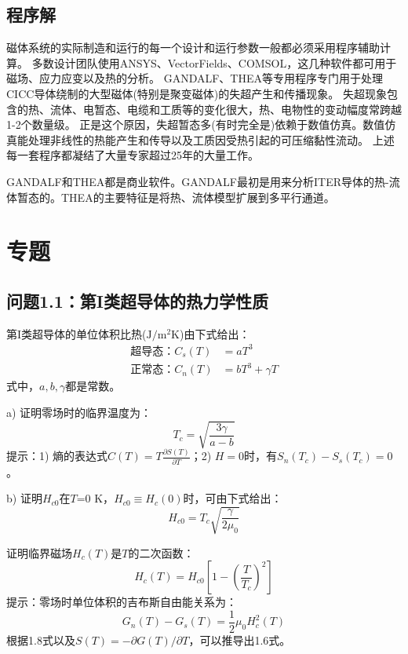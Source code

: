 \subsection{程序解}
磁体系统的实际制造和运行的每一个设计和运行参数一般都必须采用程序辅助计算。
多数设计团队使用ANSYS、VectorFields、COMSOL，这几种软件都可用于磁场、应力应变以及热的分析。
GANDALF、THEA等专用程序专门用于处理CICC导体绕制的大型磁体(特别是聚变磁体)的失超产生和传播现象。
失超现象包含的热、流体、电暂态、电缆和工质等的变化很大，热、电物性的变动幅度常跨越1-2个数量级。
正是这个原因，失超暂态多(有时完全是)依赖于数值仿真。数值仿真能处理非线性的热能产生和传导以及工质因受热引起的可压缩黏性流动。
上述每一套程序都凝结了大量专家超过25年的大量工作。

GANDALF和THEA都是商业软件。GANDALF最初是用来分析ITER导体的热-流体暂态的。THEA的主要特征是将热、流体模型扩展到多平行通道。

\section{专题}
\subsection{问题1.1：第I类超导体的热力学性质}
第I类超导体的单位体积比热($\mathrm{J/m^2K}$)由下式给出：
\begin{subequations}\label{eqn:1.4ab}
	\begin{align}
\mbox{超导态：} C_s(T) &= aT^3 \\
\mbox{正常态：} C_n(T)&= bT^3+\gamma T	
	\end{align}
\end{subequations}
式中，$a,b,\gamma$都是常数。

a) 证明零场时的临界温度为：
\begin{equation}\label{eqn:1.5}
  T_c=\sqrt{\frac{3\gamma}{a-b}}
\end{equation}
提示：1) 熵的表达式$C(T)=T\frac{\partial S(T)}{\partial T}$；2) $H=0$时，有$S_n(T_c)-S_s(T_c)=0$。

b) 证明$H_{c0}$在$T$=0 K，$H_{c0}\equiv H_c(0)$时，可由下式给出：
\begin{equation}\label{eqn:1.6}
  H_{c0}=T_c \sqrt{\frac{\gamma}{2\mu_0}}
\end{equation}

证明临界磁场$H_c(T)$是$T$的二次函数：
\begin{equation}\label{eqn:1.7}
  H_c(T)=H_{c0}\left[1-\left(\frac{T}{T_c}\right)^2\right]
\end{equation}
提示：零场时单位体积的吉布斯自由能关系为：
\begin{equation}\label{eqn:1.8}
  G_n(T)-G_s(T)=\frac{1}{2}\mu_0 H_c^2(T)
\end{equation}
根据1.8式以及$S(T)=-\partial G(T)/\partial T$，可以推导出1.6式。

